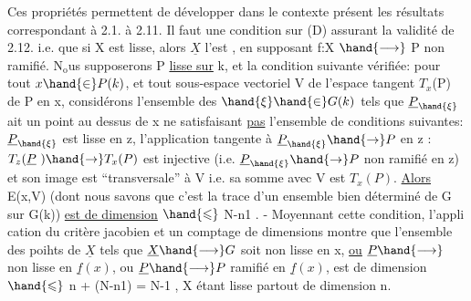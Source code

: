Ces propriétés permettent de développer dans le contexte présent
les résultats correspondant à 2.1. à 2.11. Il faut une condition sur (D)
assurant la validité de 2.12. i.e. que si X est lisse, alors $\underline{X}$ l'est
, en supposant f:X $\hand{\longrightarrow}$ P non ramifié. N$_{\mathrm{o}}$us supposerons
 P \uline{lisse sur} k, et la condition suivante vérifiée: pour
tout $x \hand{\in} P(k)$, et tout sous-espace vectoriel V  de l'espace tangent
$T_x$(P) de P en x, considérons l'ensemble  des $\hand{\xi} \hand{\in} G(k)$ tels que
$\underline{P}_{\hand{\xi}}$ ait un point au dessus de x 
ne satisfaisant \uline{pas} l'ensemble de conditions suivantes: $\underline{P}_{\hand{\xi}}$ est lisse en
z, 
l'application tangente à $\underline{P}_{\hand{\xi}} \hand{\rightarrow} P$ en z : $T_z(\underline{P}\ ) \hand{\rightarrow} T_x(P)$ est injective
(i.e. $\underline{P}_{\hand{\xi}} \hand{\rightarrow} P$ non ramifié en z) et son image est ``transversale'' à V
i.e. sa somme avec V est $T_x(P)$. \uline{Alors} E(x,V) (dont nous savons que
c'est la trace d'un ensemble   bien déterminé de G sur G(k))
\uline{est de dimension} $\hand{\leqslant}$ N-n1 . - Moyennant cette condition,  l'appli\unsure{:|-}
cation du critère jacobien et un comptage de dimensions montre que
l'ensemble des poihts de $\underline{X}$ tels que $\underline{X} \hand{\longrightarrow} G$ soit non lisse en x, \uline{ou}
$\underline{P} \hand{\longrightarrow}$  non lisse en $\underline{f}(x)$, ou $\underline{P} \hand{\longrightarrow} P$ ramifié en $\underline{f}(x)$, est de
dimension $\hand{\leqslant}$ n + (N-n1) = N-1 , \hand{(}X étant lisse partout de dimension n\hand{)}.

